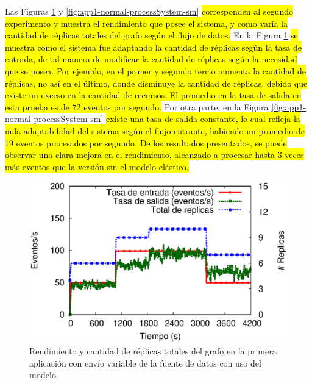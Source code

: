 Las Figuras \ref{fig:app1-normal-processSystem-cm} y \ref{fig:app1-normal-processSystem-sm} \hl{corresponden al segundo experimento y muestra el rendimiento que posee el sistema, y como varía la cantidad de réplicas totales del grafo según el flujo de datos.} En la Figura \ref{fig:app1-normal-processSystem-cm} \hl{se muestra como el sistema fue adaptando la cantidad de réplicas según la tasa de entrada, de tal manera de modificar la cantidad de réplicas según la necesidad que se posea. Por ejemplo, en el primer y segundo tercio aumenta la cantidad de réplicas, no así en el último, donde disminuye la cantidad de réplicas, debido que existe un exceso en la cantidad de recursos. El promedio en la tasa de salida en esta prueba es de 72 eventos por segundo.} Por otra parte, en la Figura \ref{fig:app1-normal-processSystem-sm} \hl{existe una tasa de salida constante, lo cual refleja la nula adaptabilidad del sistema según el flujo entrante, habiendo un promedio de 19 eventos procesados por segundo. De los resultados presentados, se puede observar una clara mejora en el rendimiento, alcanzado a procesar hasta 3 veces más eventos que la versión sin el modelo elástico.}

\begin{figure}[!ht]
	\centering
	\includegraphics[scale=0.7]{images/exp/app1/normal/cm/processSystem.eps}
    \caption{Rendimiento y cantidad de réplicas totales del grafo en la primera aplicación con envío variable de la fuente de datos con uso del modelo.}
	\label{fig:app1-normal-processSystem-cm}
\end{figure}

